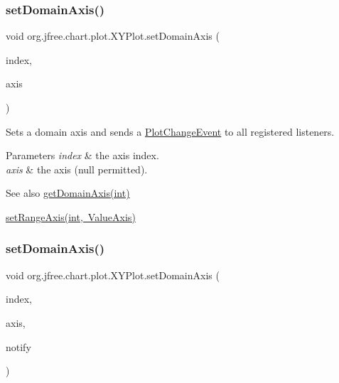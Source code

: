 \subsubsection{\texorpdfstring{set\+Domain\+Axis()}{setDomainAxis()}\hspace{0.1cm}{\footnotesize\ttfamily [2/3]}}
{\footnotesize\ttfamily void org.\+jfree.\+chart.\+plot.\+X\+Y\+Plot.\+set\+Domain\+Axis (\begin{DoxyParamCaption}\item[{int}]{index,  }\item[{\mbox{\hyperlink{classorg_1_1jfree_1_1chart_1_1axis_1_1_value_axis}{Value\+Axis}}}]{axis }\end{DoxyParamCaption})}

Sets a domain axis and sends a \mbox{\hyperlink{}{Plot\+Change\+Event}} to all registered listeners.


\begin{DoxyParams}{Parameters}
{\em index} & the axis index. \\
\hline
{\em axis} & the axis ({\ttfamily null} permitted).\\
\hline
\end{DoxyParams}
\begin{DoxySeeAlso}{See also}
\mbox{\hyperlink{classorg_1_1jfree_1_1chart_1_1plot_1_1_x_y_plot_a7a5100655e8e30cfc464b0b4f52db0e1}{get\+Domain\+Axis(int)}} 

\mbox{\hyperlink{classorg_1_1jfree_1_1chart_1_1plot_1_1_x_y_plot_adf8ca4d952a2871070c70d1dca674ec6}{set\+Range\+Axis(int, Value\+Axis)}} 
\end{DoxySeeAlso}
\mbox{\label{classorg_1_1jfree_1_1chart_1_1plot_1_1_x_y_plot_ab3a0fa76fc235deac06f35896628cd72}} 
\subsubsection{\texorpdfstring{set\+Domain\+Axis()}{setDomainAxis()}\hspace{0.1cm}{\footnotesize\ttfamily [3/3]}}
{\footnotesize\ttfamily void org.\+jfree.\+chart.\+plot.\+X\+Y\+Plot.\+set\+Domain\+Axis (\begin{DoxyParamCaption}\item[{int}]{index,  }\item[{\mbox{\hyperlink{classorg_1_1jfree_1_1chart_1_1axis_1_1_value_axis}{Value\+Axis}}}]{axis,  }\item[{boolean}]{notify }\end{DoxyParamCaption})}

